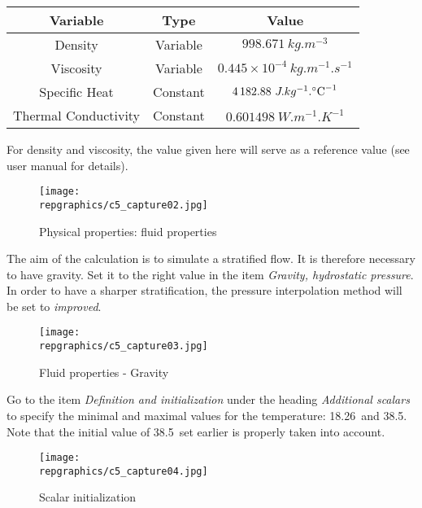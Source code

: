 \begin{center}
\begin{tabular}{c|c|c}
Variable & Type & Value \\
\hline
Density & Variable & $998.671\ kg.m^{-3} $ \\
\hline
Viscosity & Variable & $0.445\times 10^{-4}\ kg.m^{-1}.s^{-1} $ \\
\hline
Specific Heat & Constant & $4\,182.88\ J.kg^{-1}.\mbox{\degresC}^{-1} $ \\
\hline
Thermal Conductivity & Constant & $0.601498\ W.m^{-1}.K^{-1}$
\end{tabular}
\end{center}

For density and viscosity, the value given here will serve as a reference
value (see user manual for details).

\begin{figure}[h!]
\begin{center}
\texttt{[image: \\repgraphics/c5\_capture02.jpg]}
\caption{Physical properties: fluid properties}
\label{fig2_e5}
\end{center}
\end{figure}


\newpage
The aim of the calculation is to simulate a stratified flow. It is therefore
necessary to have gravity. Set it to the right value in the item
{\itshape Gravity, hydrostatic pressure}.  In order to have a sharper
stratification, the pressure interpolation method will be set to
{\itshape improved}.

\begin{figure}[h!]
\begin{center}
\texttt{[image: \\repgraphics/c5\_capture03.jpg]}
\caption{Fluid properties - Gravity}
\label{fig3_e5}
\end{center}
\end{figure}


\newpage

Go to the item {\itshape Definition and initialization} under the heading
{\itshape Additional scalars} to specify the minimal and maximal values for the
temperature: 18.26\degresC\ and 38.5\degresC. Note that the initial value of
38.5\degresC\ set earlier is properly taken into account.

\begin{figure}[h!]
\begin{center}
\texttt{[image: \\repgraphics/c5\_capture04.jpg]}
\caption{Scalar initialization}
\label{fig4_e5}
\end{center}
\end{figure}


